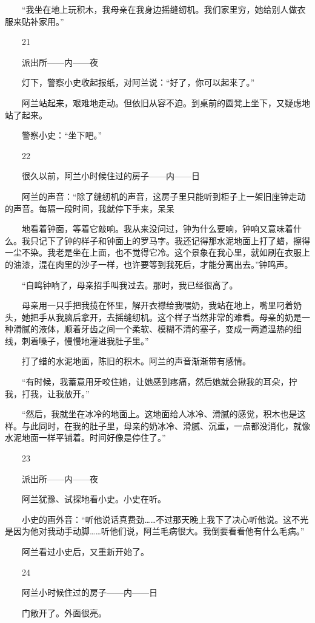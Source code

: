 　　“我坐在地上玩积木，我母亲在我身边摇缝纫机。我们家里穷，她给别人做衣服来贴补家用。” 

　　21 

　　派出所——内——夜 

　　灯下，警察小史收起报纸，对阿兰说：“好了，你可以起来了。” 

　　阿兰站起来，艰难地走动。但依旧从容不迫。到桌前的圆凳上坐下，又疑虑地站了起来。 

　　警察小史：“坐下吧。” 

　　22 

　　很久以前，阿兰小时候住过的房子——内——日 

　　阿兰的声音：“除了缝纫机的声音，这房子里只能听到柜子上一架旧座钟走动的声音。每隔一段时间，我就停下手来，呆呆 

　　地看着钟面，等着它敲响。我从来没问过，钟为什么要响，钟响又意味着什么。我只记下了钟的样子和钟面上的罗马字。我还记得那水泥地面上打了蜡，擦得一尘不染。我老是坐在上面，也不觉得它冷。这个景象在我心里，就如刷在衣服上的油漆，混在肉里的沙子一样，也许要等到我死后，才能分离出去。”钟鸣声。 

　　“自鸣钟响了，母亲招手叫我过去。那时，我已经很高了。 

　　母亲用一只手把我揽在怀里，解开衣襟给我喂奶，我站在地上，嘴里叼着奶头，她把手从我脑后拿开，去摇缝纫机。这个样子当然非常的难看。母亲的奶是一种滑腻的液体，顺着牙齿之间一个柔软、模糊不清的塞子，变成一两道温热的细线，刺着嗓子，慢慢地灌进我肚子里。” 

　　打了蜡的水泥地面，陈旧的积木。阿兰的声音渐渐带有感情。 

　　“有时候，我蓄意用牙咬住她，让她感到疼痛，然后她就会揪我的耳朵，拧我，打我，让我放开。” 

　　“然后，我就坐在冰冷的地面上。这地面给人冰冷、滑腻的感觉，积木也是这样。与此同时，在我的肚子里，母亲的奶冰冷、滑腻、沉重，一点都没消化，就像水泥地面一样平铺着。时间好像是停住了。” 

　　23 

　　派出所——内——夜 

　　阿兰犹豫、试探地看小史。小史在听。 

　　小史的画外音：“听他说话真费劲……不过那天晚上我下了决心听他说。这不光是因为他对我动手动脚……听他们说，阿兰毛病很大。我倒要看看他有什么毛病。” 

　　阿兰看过小史后，又重新开始了。 

　　24 

　　阿兰小时候住过的房子——内——日 

　　门敞开了。外面很亮。 

